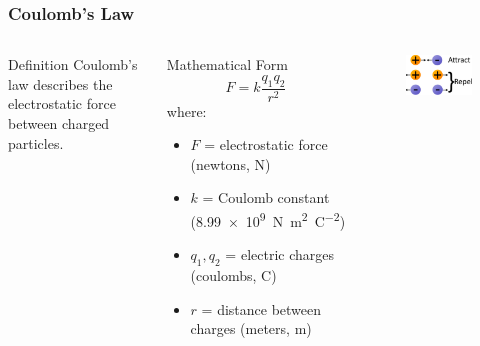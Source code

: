 \documentclass{beamer}
\begin{document}
\begin{frame}
    \frametitle{Coulomb's Law}
    \begin{columns}
        \begin{block}{Definition}
            Coulomb's law describes the electrostatic force between charged particles.
        \end{block}
        
        \begin{block}{Mathematical Form}
            \begin{equation}
                F = k\frac{q_1 q_2}{r^2}
            \end{equation}
            where:
            \begin{itemize}
                \item $F$ = electrostatic force (newtons, N)
                \item $k$ = Coulomb constant (\SI{8.99e9}{\newton\meter\squared\per\coulomb\squared})
                \item $q_1, q_2$ = electric charges (coulombs, C)
                \item $r$ = distance between charges (meters, m)
            \end{itemize}
        \end{block}
        
        \begin{alertblock}{ }
            \begin{figure}
                \centering
                \includegraphics[width=0.75\linewidth]{phys11-electrostatics-coulombs-law-diagram.png}
            \end{figure}
        \end{alertblock}
    \end{columns}
\end{frame}
\end{document}
